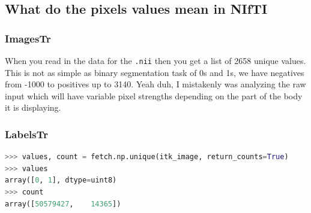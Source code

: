 \documentclass[11pt]{article}
\begin{document}
\subsection{What do the pixels values mean in NIfTI}

\subsubsection{ImagesTr}

When you read in the data for the \texttt{.nii} then you get a list of 2658 unique values. This is not as simple as binary segmentation task of 0s and 1s, we have negatives from -1000 to positives up to 3140. Yeah duh, I mistakenly was analyzing the raw input which will have variable pixel strengths depending on the part of the body it is displaying.

\subsubsection{LabelsTr}

\begin{lstlisting}[language=python]
>>> values, count = fetch.np.unique(itk_image, return_counts=True)
>>> values
array([0, 1], dtype=uint8)
>>> count
array([50579427,    14365])
\end{lstlisting}

\printbibliography
\end{document}
